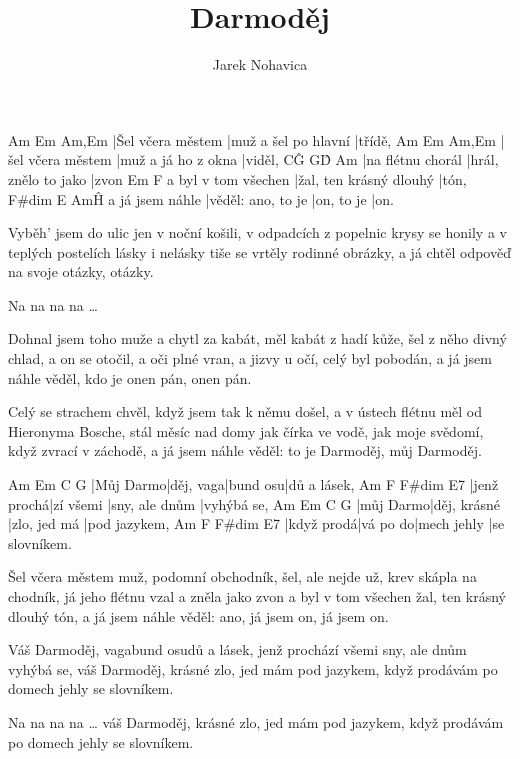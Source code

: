 \documentclass{song}
\author{Jarek Nohavica}
\title{Darmoděj}
\begin{document}
\strophe
Am                Em                   Am,Em
|Šel včera městem |muž a šel po hlavní |třídě,
Am                Em                  Am,Em
|šel včera městem |muž a já ho z okna |viděl,
C\^G              G\^D                 Am
|na flétnu chorál |hrál, znělo to jako |zvon
                    Em                      F
a byl v tom všechen |žal, ten krásný dlouhý |tón,
                F\#dim             E          Am\^H
a já jsem náhle |věděl: ano, to je |on, to je |on.
\endstrophe

\strophe*
Vyběh' jsem do ulic jen v noční košili,
v odpadcích z popelnic krysy se honily
a v teplých postelích lásky i nelásky
tiše se vrtěly rodinné obrázky,
a já chtěl odpověď na svoje otázky, otázky.
\endstrophe

Na na na na \ldots
\endstrophe

\strophe*
Dohnal jsem toho muže a chytl za kabát,
měl kabát z hadí kůže, šel z něho divný chlad,
a on se otočil, a oči plné vran,
a jizvy u očí, celý byl pobodán,
a já jsem náhle věděl, kdo je onen pán, onen pán.
\endstrophe

\strophe*
Celý se strachem chvěl, když jsem tak k němu došel,
a v ústech flétnu měl od Hieronyma Bosche,
stál měsíc nad domy jak čírka ve vodě,
jak moje svědomí, když zvrací v záchodě,
a já jsem náhle věděl: to je Darmoděj, můj Darmoděj.
\endstrophe

Am        Em        C        G
|Můj Darmo|děj, vaga|bund osu|dů a lásek,
Am          F         F\#dim         E7
|jenž prochá|zí všemi |sny, ale dnům |vyhýbá se,
Am        Em           C            G
|můj Darmo|děj, krásné |zlo, jed má |pod jazykem,
Am         F        F\#dim      E7
|když prodá|vá po do|mech jehly |se slovníkem.
\endstrophe

\strophe*
Šel včera městem muž, podomní obchodník,
šel, ale nejde už, krev skápla na chodník,
já jeho flétnu vzal a zněla jako zvon
a byl v tom všechen žal, ten krásný dlouhý tón,
a já jsem náhle věděl: ano, já jsem on, já jsem on.
\endstrophe

Váš Darmoděj, vagabund osudů a lásek,
jenž prochází všemi sny, ale dnům vyhýbá se,
váš Darmoděj, krásné zlo, jed mám pod jazykem,
když prodávám po domech jehly se slovníkem.
\endstrophe

Na na na na \ldots
váš Darmoděj, krásné zlo, jed mám pod jazykem,
když prodávám po domech jehly se slovníkem.
\endstrophe
\end{document}
